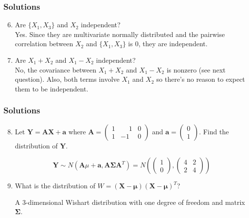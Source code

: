 \documentclass{beamer}
\begin{document}
\begin{frame}
\frametitle{Solutions}
\begin{enumerate}
\setcounter{enumi}{5}

\item Are $\{X_1, X_3\}$ and $X_2$ independent?\\
Yes.  Since they are multivariate normally distributed and the pairwise correlation between $X_2$ and $\{X_1, X_3\}$ is 0, they are independent.

\item Are $X_1 + X_2$ and $X_1 - X_2$ independent?\\
No, the covariance between  $X_1 + X_2$ and $X_1 - X_2$ is nonzero (see next question).  Also, both terms involve $X_1$ and $X_2$ so there's no reason to expect them to be independent.  
\end{enumerate}
\end{frame}

\begin{frame}
\frametitle{Solutions}
\begin{enumerate}
\setcounter{enumi}{7}
\item Let $\mathbf{Y} = \mathbf{AX} + \mathbf{a}$ where $\mathbf{A} = \begin{pmatrix} 1 & \phantom{-}1 & 0\\1 & -1 & 0\end{pmatrix}$ and $\mathbf{a} = \begin{pmatrix}0 \\ 1 \end{pmatrix}$.  Find the distribution of $\mathbf{Y}$.

$$\mathbf{Y} \sim N(\mathbf{A}\mu + \mathbf{a}, \mathbf{A\Sigma A}^T) = N\left(  \begin{pmatrix}1 \\ 0 \end{pmatrix}, \begin{pmatrix}4 & 2\\2 & 4\end{pmatrix}\right) $$

\item What is the distribution of $W = (\mathbf{X - \mu})(\mathbf{X - \mu})^T$?

A 3-dimensional Wishart distribution with one degree of freedom and matrix $\mathbf{\Sigma}$.
\end{enumerate}
\end{frame}
\end{document}
